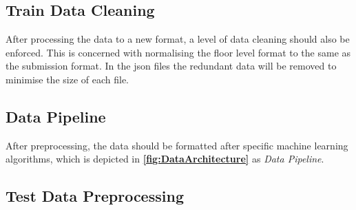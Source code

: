 \subsection{Train Data Cleaning}
After processing the data to a new format, a level of data cleaning should also be enforced. This is concerned with normalising the floor level format to the same as the submission format. In the \gls{json} files the redundant data will be removed to minimise the size of each file. %




\subsection{Data Pipeline} \label{sec:datapipeline}
After preprocessing, the data should be formatted after specific machine learning algorithms, which is depicted in \textbf{\autoref{fig:DataArchitecture}} as \textit{Data Pipeline}.

\subsection{Test Data Preprocessing}